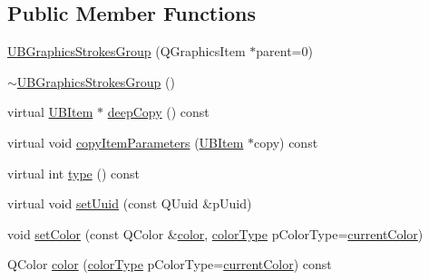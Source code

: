 \subsection*{Public Member Functions}
\begin{DoxyCompactItemize}
\item 
\hyperlink{class_u_b_graphics_strokes_group_ab3978d4c4d489c27f90baf64a506f1d8}{U\-B\-Graphics\-Strokes\-Group} (Q\-Graphics\-Item $\ast$parent=0)
\item 
\hyperlink{class_u_b_graphics_strokes_group_ae108f31c42cba50528331562b634a132}{$\sim$\-U\-B\-Graphics\-Strokes\-Group} ()
\item 
virtual \hyperlink{class_u_b_item}{U\-B\-Item} $\ast$ \hyperlink{class_u_b_graphics_strokes_group_a4932a359f046811fc1d555d5d6b49b38}{deep\-Copy} () const 
\item 
virtual void \hyperlink{class_u_b_graphics_strokes_group_ab34ce07e062a2f2bd454dc2309b88396}{copy\-Item\-Parameters} (\hyperlink{class_u_b_item}{U\-B\-Item} $\ast$copy) const 
\item 
virtual int \hyperlink{class_u_b_graphics_strokes_group_a6ae2ff9eb80bae962b6befc61278fcb7}{type} () const 
\item 
virtual void \hyperlink{class_u_b_graphics_strokes_group_ad0e51596bc0652b4889c3f215332ad72}{set\-Uuid} (const Q\-Uuid \&p\-Uuid)
\item 
void \hyperlink{class_u_b_graphics_strokes_group_a62a695811541e9e0598f1e5047daab9c}{set\-Color} (const Q\-Color \&\hyperlink{class_u_b_graphics_strokes_group_a658c2ce6d14f05667601f76c5252a733}{color}, \hyperlink{class_u_b_graphics_strokes_group_aafc5defeb806eb61efedfa57d2a35237}{color\-Type} p\-Color\-Type=\hyperlink{class_u_b_graphics_strokes_group_aafc5defeb806eb61efedfa57d2a35237aa1578878d1515dff5db323ca8403fc32}{current\-Color})
\item 
Q\-Color \hyperlink{class_u_b_graphics_strokes_group_a658c2ce6d14f05667601f76c5252a733}{color} (\hyperlink{class_u_b_graphics_strokes_group_aafc5defeb806eb61efedfa57d2a35237}{color\-Type} p\-Color\-Type=\hyperlink{class_u_b_graphics_strokes_group_aafc5defeb806eb61efedfa57d2a35237aa1578878d1515dff5db323ca8403fc32}{current\-Color}) const 
\end{DoxyCompactItemize}
